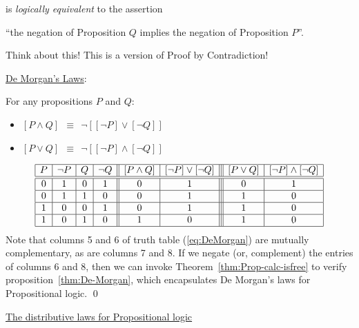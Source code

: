 \smallskip

\noindent
is {\em logically equivalent} to the assertion

\smallskip

\hspace*{.35in}
``the negation of Proposition $Q$ implies the negation of Proposition $P$''.

\smallskip

\noindent
Think about this!  This is a version of Proof by Contradiction!

\bigskip

\noindent 
\underline{\small\sf De Morgan's Laws}:

\begin{prop}
\label{thm:De-Morgan}
For any propositions $P$ and $Q$:
\begin{itemize}
\item
$[ P \wedge Q ] \ \ \equiv \ \ \neg [ [\neg P] \vee [\neg Q]]$
\item
$[ P \vee Q ] \ \ \equiv \ \ \neg [ [\neg P] \wedge [\neg Q]]$
\end{itemize}
\end{prop}

\begin{equation}
\label{eq:DeMorgan}
\begin{array}{|c|c|c|c||c|c|||c|c|}
\hline
P & \neg P & Q & \neg Q 
  & [ P \wedge Q ]
  & [\neg P] \vee [\neg Q]
  & [ P \vee Q ]
  & [\neg P] \wedge [\neg Q] \\
\hline
\hline
0 & 1 & 0 & 1
  & 0
  & 1
  & 0
  & 1 \\
\hline
0 & 1 & 1 & 0
  & 0
  & 1
  & 1
  & 0 \\
\hline
1 & 0 & 0 & 1
  & 0
  & 1
  & 1
  & 0 \\
\hline
1 & 0 & 1 & 0
  & 1
  & 0
  & 1
  & 0 \\
\hline
\end{array}
\end{equation}
Note that columns 5 and 6 of truth table (\ref{eq:DeMorgan}) are mutually complementary, as are columns 7 and 8.  If we negate (or, complement) the entries of columns 6 and 8, then we can invoke Theorem~\ref{thm:Prop-calc-isfree} to verify proposition~\ref{thm:De-Morgan}, which encapsulates De Morgan's laws for Propositional logic.  \qed

\medskip

\noindent 
\underline{\small\sf The distributive laws for Propositional logic}

